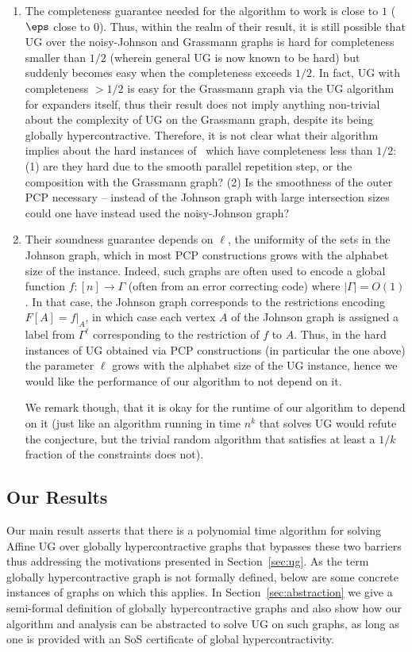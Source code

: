 \begin{enumerate}
    \item The completeness guarantee needed for the algorithm to work is close to $1$ ($\eps$ close to $0$). Thus, within the realm of their result, it is still possible that UG over the noisy-Johnson and Grassmann graphs is hard for completeness smaller than $1/2$ (wherein 
    general UG is now known to be hard) but suddenly becomes easy when the completeness exceeds $1/2$. In fact, UG with completeness $> 1/2$ is easy for the Grassmann graph via the UG algorithm for expanders itself, thus their result does not imply anything non-trivial about the complexity of UG on the Grassmann graph, despite its being globally hypercontractive. Therefore, it is not
    clear what their algorithm implies about the hard instances of~\cite{DinurKKMS18} which have completeness less than $1/2$: (1) are they hard due to the smooth parallel repetition step, or the composition with the Grassmann graph? (2) Is the smoothness of the outer PCP necessary -- instead of the Johnson graph with large intersection sizes could one have instead used the noisy-Johnson graph?    
    \item Their soundness guarantee depends on $\ell$, the uniformity of the sets in the Johnson graph, which in most PCP constructions grows with the alphabet size of the instance. Indeed, such graphs are often used to encode a global function $f\colon [n]\to\Gamma$ (often from an error correcting code) where $|\Gamma| = O(1)$. 
    In that case, the Johnson graph corresponds to the restrictions encoding
    $F[A] = f|_{A}$, in which case each vertex $A$ of the Johnson graph is 
    assigned a label from $\Gamma^{\ell}$ corresponding to the restriction of 
    $f$ to $A$. Thus, in the hard instances of UG obtained via PCP constructions (in particular the one above) the parameter $\ell$ 
    grows with the alphabet size of the UG instance, hence we would like the performance of our algorithm to not depend on it. 
    
    We remark though, that it is okay for the runtime of our algorithm to depend on it (just like an algorithm 
    running in time $n^{k}$ that solves UG 
    would refute the conjecture, but the trivial random algorithm that satisfies at least a $1/k$ fraction of the constraints does not).
\end{enumerate}

\subsection{Our Results}
Our main result asserts that there is a polynomial time algorithm for solving 
Affine UG over globally hypercontractive graphs that bypasses these 
two barriers thus addressing the motivations presented in Section~\ref{sec:ug}. As the term globally hypercontractive graph is not formally defined, 
below are some concrete instances of graphs on which this applies. In Section~\ref{sec:abstraction} we give a semi-formal definition of globally hypercontractive graphs and also show how our algorithm and analysis can be abstracted to solve UG on such graphs, as long as one is provided with an SoS certificate of global hypercontractivity.

